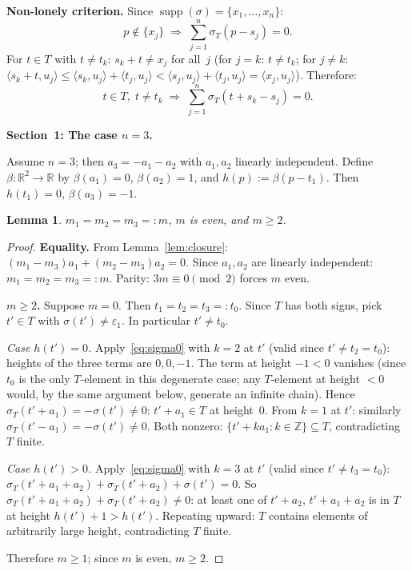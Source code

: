 \documentclass{article}
\newtheorem{lemma}{Lemma}
\begin{document}
\noindent\textbf{Non-lonely criterion.}
Since $\operatorname{supp}(\sigma)=\{x_1,\dots,x_n\}$:
\begin{equation}\label{eq:nonlonely}
  p\notin\{x_j\}
  \;\Longrightarrow\;
  \sum_{j=1}^n\sigma_T(p-s_j)=0.
\end{equation}
For $t\in T$ with $t\ne t_k$: $s_k+t\ne x_j$ for all~$j$
(for $j=k$: $t\ne t_k$; for $j\ne k$:
$\langle s_k+t,u_j\rangle\le\langle s_k,u_j\rangle+\langle t_j,u_j\rangle
<\langle s_j,u_j\rangle+\langle t_j,u_j\rangle=\langle x_j,u_j\rangle$).
Therefore:
\begin{equation}\label{eq:sigma0}
  t\in T,\;t\ne t_k
  \;\Longrightarrow\;
  \sum_{j=1}^n\sigma_T(t+s_k-s_j)=0.
\end{equation}

\bigskip
\noindent\textbf{Section~1: The case $n=3$.}

Assume $n=3$; then $a_3=-a_1-a_2$ with $a_1,a_2$ linearly independent.
Define $\beta:\mathbb{R}^2\to\mathbb{R}$ by $\beta(a_1)=0$, $\beta(a_2)=1$,
and $h(p):=\beta(p-t_1)$.
Then $h(t_1)=0$, $\beta(a_3)=-1$.

\begin{lemma}\label{lem:n3m}
$m_1=m_2=m_3=:m$, $m$ is even, and $m\ge 2$.
\end{lemma}
\begin{proof}
\textbf{Equality.}
From Lemma~\ref{lem:closure}: $(m_1-m_3)a_1+(m_2-m_3)a_2=0$.
Since $a_1,a_2$ are linearly independent: $m_1=m_2=m_3=:m$.
Parity: $3m\equiv 0\pmod 2$ forces $m$ even.

\textbf{$m\ge 2$.}
Suppose $m=0$.  Then $t_1=t_2=t_3=:t_0$.
Since $T$ has both signs, pick $t'\in T$ with $\sigma(t')\ne\varepsilon_1$.
In particular $t'\ne t_0$.

\textit{Case $h(t')=0$.}
Apply~\eqref{eq:sigma0} with $k=2$ at $t'$ (valid since $t'\ne t_2=t_0$):
heights of the three terms are $0,0,-1$.
The term at height $-1<0$ vanishes (since $t_0$ is the only $T$-element in this degenerate case;
any $T$-element at height $<0$ would, by the same argument below, generate an infinite chain).
Hence $\sigma_T(t'+a_1)=-\sigma(t')\ne 0$: $t'+a_1\in T$ at height~$0$.
From $k=1$ at $t'$: similarly $\sigma_T(t'-a_1)=-\sigma(t')\ne 0$.
Both nonzero: $\{t'+ka_1:k\in\mathbb{Z}\}\subseteq T$, contradicting $T$ finite.

\textit{Case $h(t')>0$.}
Apply~\eqref{eq:sigma0} with $k=3$ at $t'$ (valid since $t'\ne t_3=t_0$):
$\sigma_T(t'+a_1+a_2)+\sigma_T(t'+a_2)+\sigma(t')=0$.
So $\sigma_T(t'+a_1+a_2)+\sigma_T(t'+a_2)\ne 0$: at least one of $t'+a_2$, $t'+a_1+a_2$
is in $T$ at height $h(t')+1>h(t')$.
Repeating upward: $T$ contains elements of arbitrarily large height, contradicting $T$ finite.

Therefore $m\ge 1$; since $m$ is even, $m\ge 2$.
\end{proof}
\end{document}
